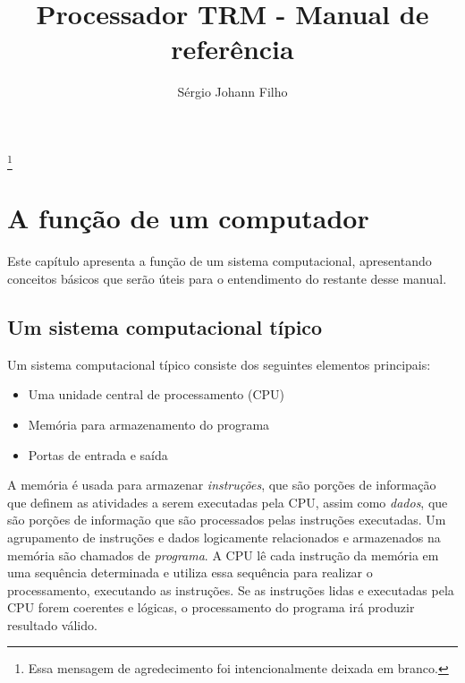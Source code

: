\documentclass[11pt,a4paper]{report}
\begin{document}
\pagestyle{empty}
\title{\textbf{Processador TRM - Manual de referência}}
\author{Sérgio Johann Filho}

\maketitle

\thispagestyle{empty}
\thanks{Essa mensagem de agredecimento foi intencionalmente deixada em branco.}
\newpage

\tableofcontents

\pagestyle{fancy}
\fancyhf{}
\lhead[]{\thepage}
\rhead[\thepage]{}

\newpage
\thispagestyle{empty}

\chapter{A função de um computador}

Este capítulo apresenta a função de um sistema computacional, apresentando
conceitos básicos que serão úteis para o entendimento do restante desse manual.

\section{Um sistema computacional típico}

Um sistema computacional típico consiste dos seguintes elementos principais:

\begin{itemize}
\item Uma unidade central de processamento (CPU)
\item Memória para armazenamento do programa
\item Portas de entrada e saída
\end{itemize}

A memória é usada para armazenar \textit{instruções}, que são porções de
informação que definem as atividades a serem executadas pela CPU, assim
como \textit{dados}, que são porções de informação que são processados
pelas instruções executadas. Um agrupamento de instruções e dados logicamente
relacionados e armazenados na memória são chamados de \textit{programa}.
A CPU lê cada instrução da memória em uma sequência determinada e utiliza
essa sequência para realizar o processamento, executando as instruções.
Se as instruções lidas e executadas pela CPU forem coerentes e lógicas,
o processamento do programa irá produzir resultado válido.
\end{document}
